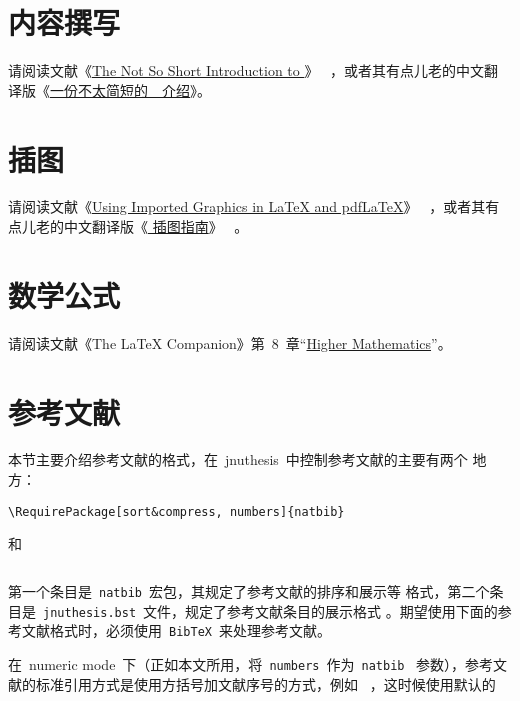 \documentclass[pdftex, twoside, bachelor]{JNUthesis}
\begin{document}
\begin{spacing}{1.25}
\section{内容撰写}

请阅读文献《\href{http://mirror.ctan.org/info/lshort/english/lshort.pdf}{The Not So Short Introduction to \LaTeXe{}}》
~\cite{Oetiker2008}，或者其有点儿老的中文翻译版《\href{http://mirror.ctan.org/info/lshort/chinese/lshort-zh-cn.pdf}{一份不太简短的~\LaTeXe{}~介绍}》\cite{lshort-cn}。

\section{插图}

请阅读文献《\href{ftp://ftp.tex.ac.uk/tex-archive/info/epslatex.pdf}{Using Imported Graphics in \LaTeX{} and pdf\LaTeX{}}》
~\cite{Reckdahl2006}，或者其有点儿老的中文翻译版《\href{http://www.ctex.org/documents/latex/graphics/}{\LaTeXe{} 插图指南}》
~\cite{Wang1997}。

\section{数学公式}

请阅读文献《The LaTeX Companion》第~8~章``\href{http://media.cism.it/attachments/ch8.pdf}{Higher Mathematics}''\cite{Goossens1997}。


\section{参考文献}

本节主要介绍参考文献的格式，在~jnuthesis~中控制参考文献的主要有两个
地方：

\begin{verbatim}
\RequirePackage[sort&compress, numbers]{natbib}
\end{verbatim}

\noindent 和

\begin{verbatim}

\end{verbatim}

\noindent 第一个条目是~\texttt{natbib}~宏包，其规定了参考文献的排序和展示等
格式，第二个条目是~\texttt{jnuthesis.bst}~文件，规定了参考文献条目的展示格式
。期望使用下面的参考文献格式时，必须使用~\texttt{BibTeX}~来处理参考文献。

在~numeric mode~下（正如本文所用，将~\texttt{numbers}~作为~\texttt{natbib}~
 参数），参考文献的标准引用方式是使用方括号加文献序号的方式，例如~
\cite{Al-Osh1987}，这时候使用默认的~


\end{spacing}
\end{document}
